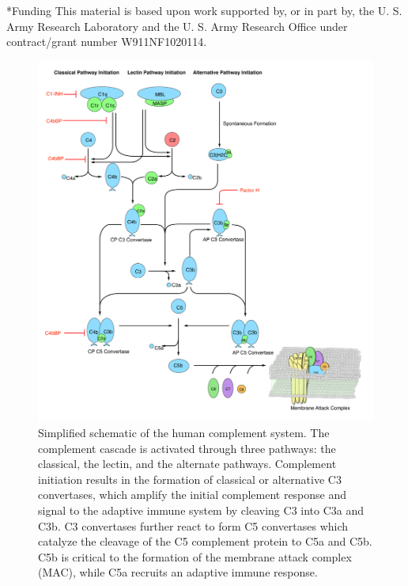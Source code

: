 \documentclass[12pt]{article}
\makeatletter
\renewcommand\section{\@startsection
	{subsection}{2}{0mm}
	{-0.2in}
	{0.05\baselineskip}
	{\normalfont\large\bfseries}}
\makeatother
\begin{document}
\section*{Funding}
This material is based upon work supported by, or in part by, the U. S. Army Research Laboratory and the U. S. Army Research Office under contract/grant number W911NF1020114.

\clearpage




\clearpage


\begin{figure}[h]
\centering
\includegraphics[width=1.0\textwidth]{./figs/Fig1_Schematic_v2.pdf}
\caption{Simplified schematic of the human complement system. The complement cascade is activated through three pathways:  the classical, the lectin, and the alternate pathways.
Complement initiation results in the formation of classical or alternative C3 convertases, which amplify the initial complement response and signal to the adaptive immune system by cleaving C3 into C3a and C3b. C3 convertases further react to form C5 convertases which catalyze the cleavage of the C5 complement protein to C5a and C5b.
C5b is critical to the formation of the membrane attack complex (MAC), while C5a recruits an adaptive immune response.}\label{fig-schematic}
\end{figure}
\end{document}
